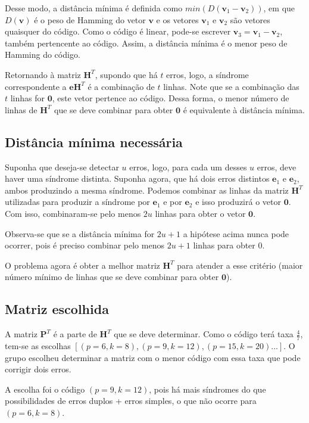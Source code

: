 Desse modo, a distância mínima é definida como $min(D(\textbf{v}_1-\textbf{v}_2))$, em que $D(\textbf{v})$ é o peso de Hamming do vetor $\textbf{v}$ e os vetores $\textbf{v}_1$ e $\textbf{v}_2$ são vetores quaisquer do código. Como o código é linear, pode-se escrever $\textbf{v}_3 = \textbf{v}_1-\textbf{v}_2$, também pertencente ao código. Assim, a distância mínima é o menor peso de Hamming do código.

Retornando à matriz $\textbf{H}^T$, supondo que há $t$ erros, logo, a síndrome correspondente a $\textbf{e}\textbf{H}^T$ é a combinação de $t$ linhas. Note que se a combinação das $t$ linhas for $\textbf{0}$, este vetor pertence ao código. Dessa forma, o menor número de linhas de $\textbf{H}^T$ que se deve combinar para obter $\textbf{0}$ é equivalente à distância mínima.

\subsection{Distância mínima necessária}

Suponha que deseja-se detectar $u$ erros, logo, para cada um desses $u$ erros, deve haver uma síndrome distinta. Suponha agora, que há dois erros distintos $\textbf{e}_1$ e $\textbf{e}_2$, ambos produzindo a mesma síndrome. Podemos combinar as linhas da matriz $\textbf{H}^T$ utilizadas para produzir a síndrome por $\textbf{e}_1$ e por $\textbf{e}_2$ e isso produzirá o vetor $\textbf{0}$. Com isso, combinaram-se pelo menos $2u$ linhas para obter o vetor $\textbf{0}$.

Observa-se que se a distância mínima for $2u+1$ a hipótese acima nunca pode ocorrer, pois é preciso combinar pelo menos $2u+1$ linhas para obter $0$.

O problema agora é obter a melhor matriz $\textbf{H}^T$ para atender a esse critério (maior número mínimo de linhas que se deve combinar para obter $\textbf{0}$).

\subsection{Matriz escolhida}

A matriz $\textbf{P}^T$ é a parte de $\textbf{H}^T$ que se deve determinar. Como o código terá taxa $\frac{4}{7}$, tem-se as escolhas $[(p=6, k=8), (p=9, k=12), (p=15, k=20)...]$. O grupo escolheu determinar a matriz com o menor código com essa taxa que pode corrigir dois erros.

A escolha foi o código $(p=9, k=12)$, pois há mais síndromes do que possibilidades de erros duplos + erros simples, o que não ocorre para $(p=6, k=8)$.